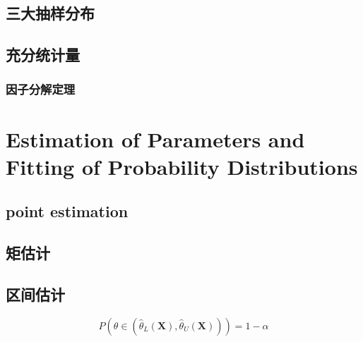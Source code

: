 \documentclass[cn,11pt,chinese,black]{elegantbook}
\begin{document}
\section{三大抽样分布}
\section{充分统计量}
\subsection{因子分解定理}
\chapter{Estimation of Parameters	and Fitting of Probability	Distributions}
\section{point estimation}
\section{矩估计}
\section{区间估计}
$$P\left(\theta \in\left(\hat{\theta}_{L}(\mathbf{X}), \hat{\theta}_{U}(\mathbf{X})\right)\right)=1-\alpha$$
\end{document}
